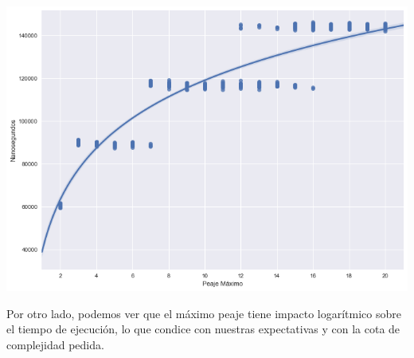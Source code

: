 \begin{center}
	\includegraphics[scale=0.5]{imagenes/ej2-2.png}
\end{center}

Por otro lado, podemos ver que el máximo peaje tiene impacto logarítmico sobre el tiempo de ejecución, lo que condice con nuestras expectativas y con la cota de complejidad pedida.

